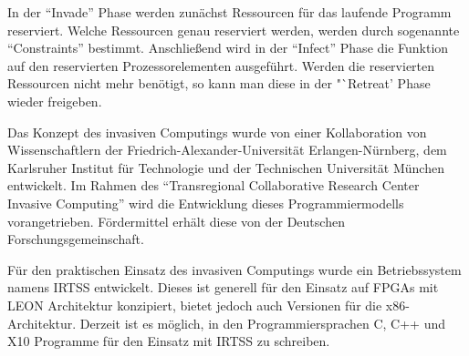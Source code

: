 In der "`Invade"' Phase werden zunächst Ressourcen für das laufende Programm reserviert. Welche Ressourcen genau reserviert werden,
werden durch sogenannte "`Constraints"' bestimmt\cite{invasicWikiOverview}.
Anschließend wird in der "`Infect"' Phase die Funktion auf den reservierten Prozessorelementen ausgeführt\cite{invasicWikiOverview}.
Werden die reservierten Ressourcen nicht mehr benötigt, so kann man diese in der "`Retreat' Phase wieder
freigeben\cite{invasicWikiOverview}.

Das Konzept des invasiven Computings wurde von einer Kollaboration von Wissenschaftlern der
Friedrich-Alexander-Universität Erlangen-Nürnberg, dem Karlsruher Institut für Technologie und der 
Technischen Universität München entwickelt\cite{invasicHome}.
Im Rahmen des "`Transregional Collaborative Research Center Invasive Computing"'\cite{invasicHome}
wird die Entwicklung dieses Programmiermodells vorangetrieben.
Fördermittel erhält diese von der Deutschen Forschungsgemeinschaft\cite{invasicHome}.

Für den praktischen Einsatz des invasiven Computings wurde ein Betriebssystem namens IRTSS entwickelt. Dieses ist generell für den
Einsatz auf FPGAs mit LEON Architektur konzipiert, bietet jedoch auch Versionen für die x86-Architektur. Derzeit ist es möglich,
in den Programmiersprachen C, C++ und X10 Programme für den Einsatz mit IRTSS zu schreiben.
